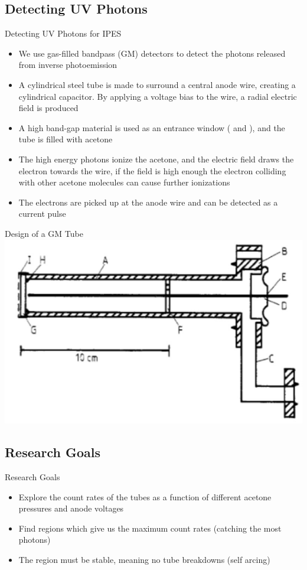 \documentclass[12pt, aspectratio=169]{beamer}
\begin{document}
\subsection{Detecting UV Photons}
\begin{frame}{Detecting UV Photons for IPES}
    \begin{itemize}
        \item We use gas-filled bandpass (GM) detectors to detect the photons released from inverse photoemission
        \item A cylindrical steel tube is made to surround a central anode wire, creating a cylindrical capacitor. By applying a voltage bias to the wire, a radial electric field is 
        produced
        \item A high band-gap material is used as an entrance window ( and ), and the tube is filled with acetone
        \item The high energy photons ionize the acetone, and the electric field draws the electron towards the wire, if the field is high enough the electron colliding with other 
        acetone molecules can cause further ionizations
        \item The electrons are picked up at the anode wire and can be detected as a current pulse
    \end{itemize}
\end{frame}

\begin{frame}{Design of a GM Tube}
    \centering
    \includegraphics[scale=0.45]{Figs/tubedesign.png}
\end{frame}

\subsection{Research Goals}
\begin{frame}{Research Goals}
    \begin{itemize}
        \item Explore the count rates of the tubes as a function of different acetone pressures and anode voltages
        \item Find regions which give us the maximum count rates (catching the most photons)
        \item The region must be stable, meaning no tube breakdowns (self arcing) 
    \end{itemize}
\end{frame}
\end{document}
